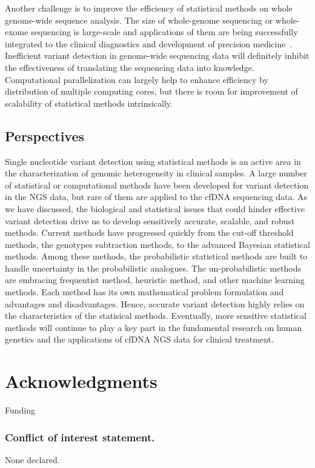 \documentclass[a4,center,fleqn]{NAR}
\begin{document}
Another challenge is to improve the efficiency of statistical methods on whole genome-wide sequence analysis.
The size of whole-genome sequencing or whole-exome sequencing is large-scale and applications of them are being successfully integrated to the clinical diagnostics and development of precision medicine~\citep{chiang2012exome, worthey2011making}.
Inefficient variant detection in genome-wide sequencing data will definitely inhibit the effectiveness of translating the sequencing data into knowledge.
Computational parallelization can largely help to enhance efficiency by distribution of multiple computing cores, but there is room for improvement of scalability of statistical methods intrinsically.



\subsection{Perspectives}

Single nucleotide variant detection using statistical methods is an active area in the characterization of genomic heterogeneity in clinical samples.
A large number of statistical or computational methods have been developed for variant detection in the NGS data, but rare of them are applied to the cfDNA sequencing data.
As we have discussed, the biological and statistical issues that could hinder effective variant detection drive us to develop sensitively accurate, scalable, and robust methods.
Current methods have progressed quickly from the cut-off threshold methods, the genotypes subtraction methods, to the advanced Bayesian statistical methods.
Among these methods, the probabilistic statistical methods are built to handle uncertainty in the probabilistic analogues.
The un-probabilistic methods are embracing frequentist method, heuristic method, and other machine learning methods.
Each method has its own mathematical problem formulation and advantages and disadvantages.
Hence, accurate variant detection highly relies on the characteristics of the statisical methods.
Eventually, more sensitive statistical methods will continue to play a key part in the fundamental research on human genetics and the applications of cfDNA NGS data for clinical treatment. 








\section{Acknowledgments}
Funding




\subsubsection{Conflict of interest statement.} None declared.
\newpage



\end{document}
